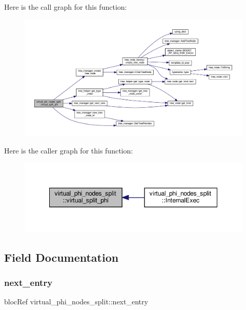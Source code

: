Here is the call graph for this function\+:
\nopagebreak
\begin{figure}[H]
\begin{center}
\leavevmode
\includegraphics[width=350pt]{df/d2f/classvirtual__phi__nodes__split_a91b2c477a5cec0ee3a6882c187f03a53_cgraph}
\end{center}
\end{figure}
Here is the caller graph for this function\+:
\nopagebreak
\begin{figure}[H]
\begin{center}
\leavevmode
\includegraphics[width=348pt]{df/d2f/classvirtual__phi__nodes__split_a91b2c477a5cec0ee3a6882c187f03a53_icgraph}
\end{center}
\end{figure}


\subsection{Field Documentation}
\mbox{\label{classvirtual__phi__nodes__split_a5f78a71c01295fface9f972fae355367}} 
\subsubsection{\texorpdfstring{next\+\_\+entry}{next\_entry}}
{\footnotesize\ttfamily bloc\+Ref virtual\+\_\+phi\+\_\+nodes\+\_\+split\+::next\+\_\+entry\hspace{0.3cm}{\ttfamily [private]}}



